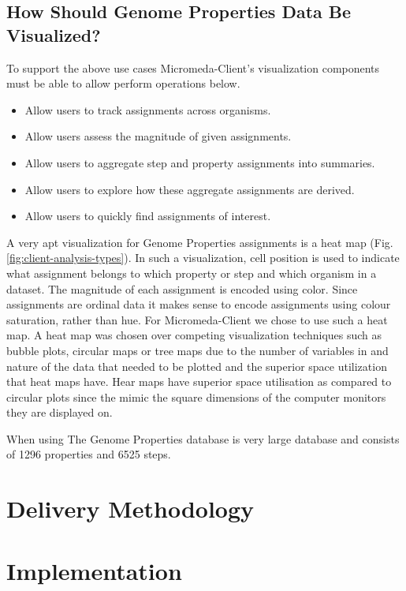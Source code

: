 \subsection{How Should Genome Properties Data Be Visualized?}

To support the above use cases Micromeda-Client's visualization components must be able to allow perform operations below.

\begin{itemize}
\item Allow users to track assignments across organisms.
\item Allow users assess the magnitude of given assignments.
\item Allow users to aggregate step and property assignments into summaries.
\item Allow users to explore how these aggregate assignments are derived.
\item Allow users to quickly find assignments of interest.
\end{itemize}

A very apt visualization for Genome Properties assignments is a heat map (Fig. \ref{fig:client-analysis-types}). In such a visualization, cell position is used to indicate what assignment belongs to which property or step and which organism in a dataset. The magnitude of each assignment is encoded using color. Since assignments are ordinal data it makes sense to encode assignments using colour saturation, rather than hue. For Micromeda-Client we chose to use such a heat map. A heat map was chosen over competing visualization techniques such as bubble plots, circular maps or tree maps due to the number of variables in and nature of the data that needed to be plotted and the superior space utilization that heat maps have. Hear maps have superior space utilisation as compared to circular plots since the mimic the square dimensions of the computer monitors they are displayed on.

When using The Genome Properties database is very large database and consists of 1296 properties and 6525 steps.

\section{Delivery Methodology}

\section{Implementation}

